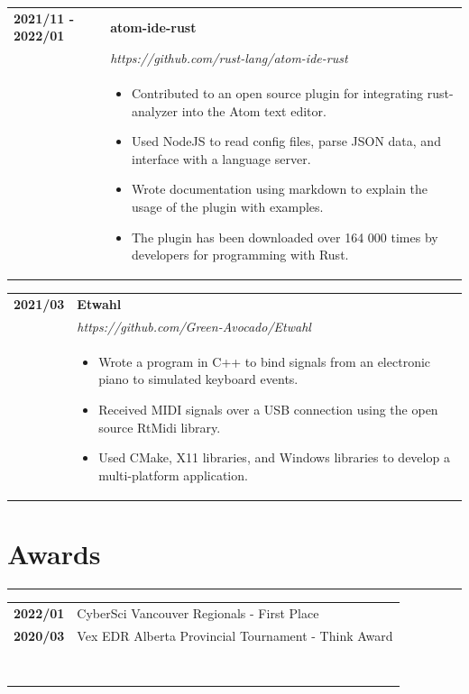 \documentclass[letterpaper]{article}
\newcommand{\sectcolor}{cyan}
\newcommand{\sect}[1]{\section*{#1}
                        {\color{\sectcolor}
                        \rule{\textwidth}{1pt}
                        \vspace{-7pt}}}
\begin{document}
        \begin{tabular}{p{} p{}}
            \textbf{2021/11 - 2022/01} & \textbf{atom-ide-rust} \\
            & \emph{https://github.com/rust-lang/atom-ide-rust} \\
            & \begin{itemize}
                \item Contributed to an open source plugin for integrating rust-analyzer into the Atom
                    text editor.
                \item Used NodeJS to read config files, parse JSON data, and interface with a language
                    server.
                \item Wrote documentation using markdown to explain the usage of the plugin with examples.
                \item The plugin has been downloaded over 164 000 times by developers for programming with
                    Rust.
            \end{itemize}
        \end{tabular}

        \begin{tabular}{p{} p{}}
            \textbf{2021/03} & \textbf{Etwahl} \\
            & \emph{https://github.com/Green-Avocado/Etwahl} \\
            & \begin{itemize}
                \item Wrote a program in C++ to bind signals from an electronic piano to simulated
                    keyboard events.
                \item Received MIDI signals over a USB connection using the open source RtMidi library.
                \item Used CMake, X11 libraries, and Windows libraries to develop a multi-platform
                    application.
            \end{itemize}
        \end{tabular}

    \sect{Awards}

        \begin{tabular}{p{} p{}}
            \textbf{2022/01} & CyberSci Vancouver Regionals - First Place \\
            \textbf{2020/03} & Vex EDR Alberta Provincial Tournament - Think Award \\

            \\\\\\\\\\\\\\\\
        \end{tabular}
\end{document}
